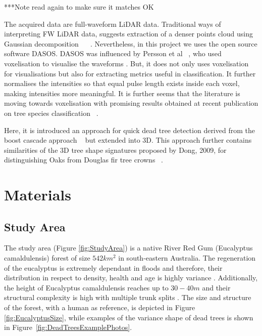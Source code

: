\documentclass{subfiles}
\begin{document}
{\color{red} ***Note read again to make sure it matches OK}
\par The acquired data are full-waveform LiDAR data. Traditional ways of interpreting FW LiDAR data, suggests extraction of a denser points cloud using Gaussian decomposition ~\cite{Neuenschwander2009} ~\cite{Reitberger2008}. Nevertheless, in this project we uses the open source software DASOS. DASOS was influenced by Persson et al ~\cite{Persson2005}, who used voxelisation to visualise the waveforms . But, it does not only uses voxelisation for visualisations but also for extracting metrics useful in classification. It further normalises the intensities so that equal pulse length exists inside each voxel, making intensities more meaningful. It is further seems that the literature is moving towards voxelisation with promising results obtained at recent publication on tree species classification ~\cite{Cao2016}. 

Here, it is introduced an approach for quick dead tree detection derived from the boost cascade approach ~\cite{Viola2001} but extended into 3D. This approach further contains similarities of the 3D tree shape signatures proposed by Dong, 2009, for distinguishing Oaks from Douglas fir tree crowns ~\cite{Dong2009}. 












\section{Materials}

\subsection{Study Area} \label{sec:StudyArea}

The study area (Figure \ref{fig:StudyArea}) is a native River Red Gum (Eucalyptus camaldulensis) forest  of size $542km^2$ in south-eastern Australia. The regeneration of the eucalyptus is extremely dependant in floods and therefore, their distribution in respect to density, health and age is highly variance \cite{Kerle2005}. Additionally, the height of Eucalyptus camaldulensis reaches up to $30-40m$ and their structural complexity is high with multiple trunk splits \cite{Wilson1995}. The size and structure of the forest, with a human as reference, is depicted in Figure \ref{fig:EucalyptusSize}, while examples of the variance shape of dead trees is shown in Figure~\ref{fig:DeadTreesExamplePhotos}. 
\end{document}
